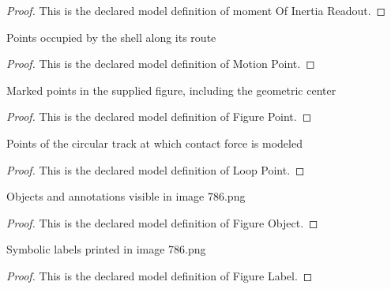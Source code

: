 \begin{proof}
  This is the declared model definition of moment Of Inertia Readout.
\end{proof}
\begin{definition}
  \label{def:physics:phyx-mini-0786:phyxminiproblems-problemphyxmini0786-motionpoint}
  Points occupied by the shell along its route
\end{definition}
\begin{proof}
  This is the declared model definition of Motion Point.
\end{proof}
\begin{definition}
  \label{def:physics:phyx-mini-0786:phyxminiproblems-problemphyxmini0786-figurepoint}
  Marked points in the supplied figure, including the geometric center
\end{definition}
\begin{proof}
  This is the declared model definition of Figure Point.
\end{proof}
\begin{definition}
  \label{def:physics:phyx-mini-0786:phyxminiproblems-problemphyxmini0786-looppoint}
  Points of the circular track at which contact force is modeled
\end{definition}
\begin{proof}
  This is the declared model definition of Loop Point.
\end{proof}
\begin{definition}
  \label{def:physics:phyx-mini-0786:phyxminiproblems-problemphyxmini0786-figureobject}
  Objects and annotations visible in image 786.png
\end{definition}
\begin{proof}
  This is the declared model definition of Figure Object.
\end{proof}
\begin{definition}
  \label{def:physics:phyx-mini-0786:phyxminiproblems-problemphyxmini0786-figurelabel}
  Symbolic labels printed in image 786.png
\end{definition}
\begin{proof}
  This is the declared model definition of Figure Label.
\end{proof}
